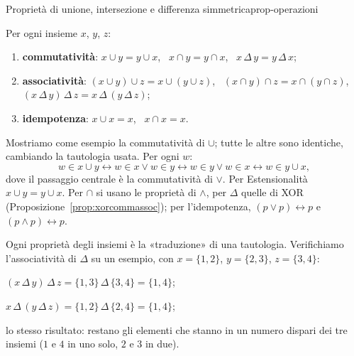\begin{concetto}
\begin{Proposizione}{Proprietà di unione, intersezione e differenza simmetrica}{prop-operazioni}
    \begin{prerequisiti}
    \end{prerequisiti}
    Per ogni insieme $x$, $y$, $z$:
    \begin{enumerate}
        \item \textbf{commutatività}: $x \cup y = y \cup x$, \ $x \cap y = y \cap x$, \ $x \,\Delta\, y = y \,\Delta\, x$;
        \item \textbf{associatività}: $(x \cup y) \cup z = x \cup (y \cup z)$, \ $(x \cap y) \cap z = x \cap (y \cap z)$, \
              $(x \,\Delta\, y) \,\Delta\, z = x \,\Delta\, (y \,\Delta\, z)$;
        \item \textbf{idempotenza}: $x \cup x = x$, \ $x \cap x = x$.
    \end{enumerate}
\end{Proposizione}
\begin{dimostrazione}
    Mostriamo come esempio la commutatività di $\cup$; tutte le altre sono identiche, cambiando la tautologia usata.
    Per ogni $w$:
    \[ w \in x \cup y \leftrightarrow w \in x \vee w \in y \leftrightarrow w \in y \vee w \in x \leftrightarrow w \in y \cup x, \]
    dove il passaggio centrale è la commutatività di $\vee$. Per Estensionalità $x \cup y = y \cup x$.
    Per $\cap$ si usano le proprietà di $\wedge$, per $\Delta$ quelle di XOR (Proposizione~\ref{prop:xorcommassoc});
    per l'idempotenza, $(p \vee p) \leftrightarrow p$ e $(p \wedge p) \leftrightarrow p$.
\end{dimostrazione}
\end{concetto}

\begin{spiegazione}
    Ogni proprietà degli insiemi è la «traduzione» di una tautologia. Verifichiamo l'associatività di $\Delta$ su un esempio, con $x = \{1, 2\}$, $y = \{2, 3\}$, $z = \{3, 4\}$:
    \begin{passi}
        \item $(x \,\Delta\, y) \,\Delta\, z = \{1, 3\} \,\Delta\, \{3, 4\} = \{1, 4\}$;
        \item $x \,\Delta\, (y \,\Delta\, z) = \{1, 2\} \,\Delta\, \{2, 4\} = \{1, 4\}$;
        \item lo stesso risultato: restano gli elementi che stanno in un numero dispari dei tre insiemi ($1$ e $4$ in uno solo, $2$ e $3$ in due).
    \end{passi}
\end{spiegazione}


